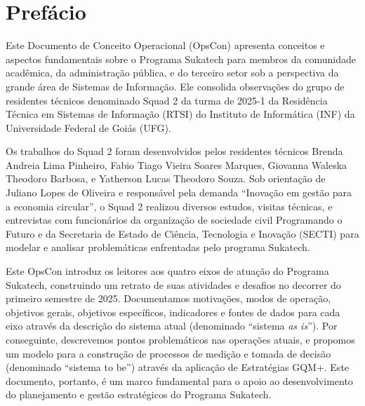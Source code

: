 \documentclass[
	12pt,				%
	openright,			%
	twoside,			%
	a4paper,			%
	english,			%
	french,				%
	spanish,			%
	brazil,				%
	]{abntex2}
\begin{document}
\textual

\chapter*[Prefácio]{Prefácio}

Este Documento de Conceito Operacional (OpsCon) apresenta conceitos e aspectos fundamentais sobre o Programa Sukatech para membros da comunidade acadêmica, da administração pública, e do terceiro setor sob a perspectiva da grande área de Sistemas de Informação. Ele consolida observações do grupo de residentes técnicos denominado Squad 2 da turma de 2025-1 da Residência Técnica em Sistemas de Informação (RTSI) do Instituto de Informática (INF) da Universidade Federal de Goiás (UFG).

Os trabalhos do Squad 2 foram desenvolvidos pelos residentes técnicos Brenda Andreia Lima Pinheiro, Fabio Tiago Vieira Soares Marques, Giovanna Waleska Theodoro Barbosa, e Yatherson Lucas Theodoro Souza. Sob orientação de Juliano Lopes de Oliveira e responsável pela demanda ``Inovação em gestão para a economia circular'', o Squad 2 realizou diversos estudos, visitas técnicas, e entrevistas com funcionários da organização de sociedade civil Programando o Futuro e da Secretaria de Estado de Ciência, Tecnologia e Inovação (SECTI) para modelar e analisar problemáticas enfrentadas pelo programa Sukatech.

Este OpsCon introduz os leitores aos quatro eixos de atuação do Programa Sukatech, construindo um retrato de suas atividades e desafios no decorrer do primeiro semestre de 2025. Documentamos motivações, modos de operação, objetivos gerais, objetivos específicos, indicadores e fontes de dados para cada eixo através da descrição do sistema atual (denominado ``sistema \textit{as is}''). Por conseguinte, descrevemos pontos problemáticos nas operações atuais, e propomos um modelo para a construção de processos de medição e tomada de decisão (denominado ``sistema to be'') através da aplicação de Estratégias GQM+. Este documento, portanto, é um marco fundamental para o apoio ao desenvolvimento do planejamento e gestão estratégicos do Programa Sukatech.
\end{document}

